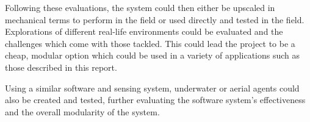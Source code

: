 Following these evaluations, the system could then either be upscaled in 
mechanical terms to perform in the field or used directly and tested in the 
field. Explorations of different real-life environments could be evaluated 
and the challenges which come with those tackled. This could lead the 
project to be a cheap, modular option which could be used in a variety of 
applications such as those described in this report. 

Using a similar software and sensing system, underwater or aerial agents 
could also be created and tested, further evaluating the software system's 
effectiveness and the overall modularity of the system. 